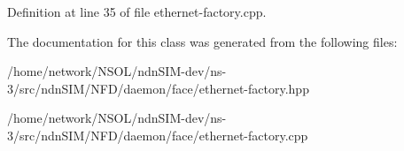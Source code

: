 Definition at line 35 of file ethernet-\/factory.\+cpp.



The documentation for this class was generated from the following files\+:\begin{DoxyCompactItemize}
\item 
/home/network/\+N\+S\+O\+L/ndn\+S\+I\+M-\/dev/ns-\/3/src/ndn\+S\+I\+M/\+N\+F\+D/daemon/face/ethernet-\/factory.\+hpp\item 
/home/network/\+N\+S\+O\+L/ndn\+S\+I\+M-\/dev/ns-\/3/src/ndn\+S\+I\+M/\+N\+F\+D/daemon/face/ethernet-\/factory.\+cpp\end{DoxyCompactItemize}
